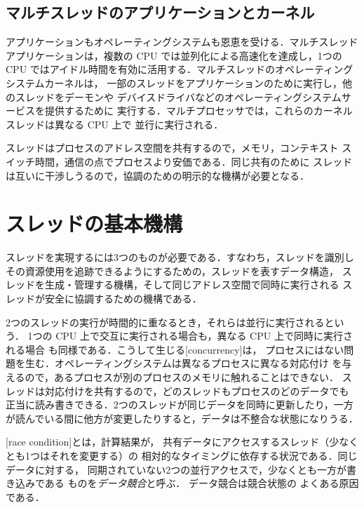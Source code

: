 \documentclass[../main.tex]{subfiles}
\begin{document}
\subsection{マルチスレッドのアプリケーションとカーネル}

アプリケーションもオペレーティングシステムも恩恵を受ける．マルチスレッド
アプリケーションは，複数の CPU では並列化による高速化を達成し，1つの CPU
ではアイドル時間を有効に活用する．マルチスレッドのオペレーティングシステムカーネルは，
一部のスレッドをアプリケーションのために実行し，他のスレッドをデーモンや
デバイスドライバなどのオペレーティングシステムサービスを提供するために
実行する．マルチプロセッサでは，これらのカーネルスレッドは異なる CPU 上で
並行に実行される．

\begin{keypoint}
  スレッドはプロセスのアドレス空間を共有するので，メモリ，コンテキスト
  スイッチ時間，通信の点でプロセスより安価である．同じ共有のために
  スレッドは互いに干渉しうるので，協調のための明示的な機構が必要となる．
\end{keypoint}

\section{スレッドの基本機構}
\label{sec:l03-mechanisms}

スレッドを実現するには3つのものが必要である．すなわち，スレッドを識別し
その資源使用を追跡できるようにするための，スレッドを表すデータ構造，
スレッドを生成・管理する機構，そして同じアドレス空間で同時に実行される
スレッドが安全に協調するための機構である．

2つのスレッドの実行が時間的に重なるとき，それらは並行に実行されるという．
1つの CPU 上で交互に実行される場合も，異なる CPU 上で同時に実行される場合
も同様である．こうして生じる[concurrency]は，
プロセスにはない問題を生む．オペレーティングシステムは異なるプロセスに異なる対応付け
を与えるので，あるプロセスが別のプロセスのメモリに触れることはできない．
スレッドは対応付けを共有するので，どのスレッドもプロセスのどのデータでも
正当に読み書きできる．2つのスレッドが同じデータを同時に更新したり，一方
が読んでいる間に他方が変更したりすると，データは不整合な状態になりうる．

\begin{definition}[競合状態]
  [race condition]とは，計算結果が，
  共有データにアクセスするスレッド（少なくとも1つはそれを変更する）の
  相対的なタイミングに依存する状況である．同じデータに対する，
  同期されていない2つの並行アクセスで，少なくとも一方が書き込みである
  ものを\emph{データ競合}と呼ぶ．%
  データ競合は競合状態の
  よくある原因である．
\end{definition}
\end{document}
